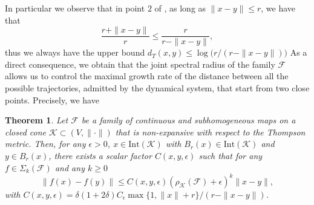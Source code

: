 \documentclass{article}
\newtheorem{theorem}{Theorem}[section]
\newcommand{\family}{\mathcal{F}}
\newcommand{\cradius}{\rho_{\cone}}
\newcommand{\cone}{\mathcal{K}}
\newcommand{\interior}{\mathrm{Int}}
\newcommand{\distT}{d_T}
\begin{document}
In particular we observe that in point $2$ of , as long as $\|x-y\|\leq r$, we have that
\begin{equation}
    \frac{r+\|x-y\|}{r}\leq \frac{r}{r-\|x-y\|}, 
\end{equation}
thus we always have the upper bound $\distT(x,y)\leq \log\big(r/(r-\|x-y\|)\big)$
%
%
As a direct consequence, we obtain that the joint spectral radius of the family $\family$ allows us to control the maximal growth rate of the distance between all the possible trajectories, admitted by the dynamical system, that start from two close points. Precisely, we have
%
%
%
\begin{theorem}\label{Theorem_Lipshitz_constant_bound_JSR}
Let $\family$ be a family of continuous and subhomogeneous maps on a closed cone $\cone\subset (V,\|\cdot\|)$ that is non-expansive with respect to the Thompson metric. Then, for any $\epsilon>0$, $x\in \interior(\cone)$ with $B_r(x)\in \interior(\cone)$ and $y\in B_r(x)$, there exists a scalar factor $C(x,y,\epsilon)$ such that for any $f\in \Sigma_k(\family)$ and any $k\geq 0$
%
$$\|f(x)-f(y)\|\leq C(x,y,\epsilon) (\cradius(\family)+\epsilon)^k \|x-y\|,$$
%
with $C(x,y,\epsilon)=\delta(1+2\delta) C_\epsilon \max\{1,\|x\|+r\}/(r-\|x-y\|)$.
\end{theorem}
\end{document}
